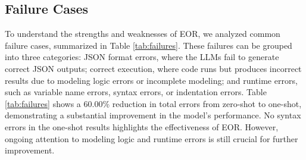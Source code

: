 

\subsection{Failure Cases}
To understand the strengths and weaknesses of EOR, we analyzed common failure cases, summarized in Table \ref{tab:failures}. These failures can be grouped into three categories: JSON format errors, where the LLMs fail to generate correct JSON outputs; correct execution, where code runs but produces incorrect results due to modeling logic errors or incomplete modeling; and runtime errors, such as variable name errors, syntax errors, or indentation errors. Table \ref{tab:failures} shows a 60.00\% reduction in total errors from zero-shot to one-shot, demonstrating a substantial improvement in the model's performance.
No syntax errors in the one-shot results highlights the effectiveness of EOR. However, ongoing attention to modeling logic and runtime errors is still crucial for further improvement.

